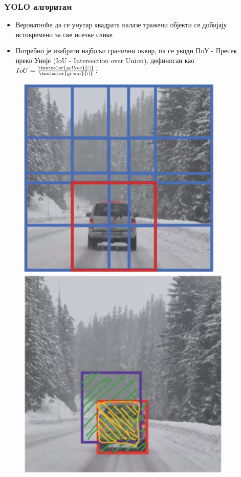 \begin{frame}
\frametitle{YOLO алгоритам}
\begin{itemize}
 \item Вероватноће да се унутар квадрата налазе тражени објекти
 се добијају \alert{истовремено} за све исечке слике
 \item Потребно је изабрати најбољи гранични оквир, па се уводи
 \alert{ПпУ - Пресек преко Уније} (\alert{IoU - Intersection over Union}),
 дефинисан као $IoU = \frac{\textcolor{yellow}{\cap}}{\textcolor{green}{\cup}}$:
\end{itemize}
\begin{figure}[H]
  \centering
      \includegraphics[scale=0.4]{slike/ngSlidWConv3.png} \qquad
      \includegraphics[scale=0.38]{slike/ngIoU.png}
\end{figure}
\end{frame}

